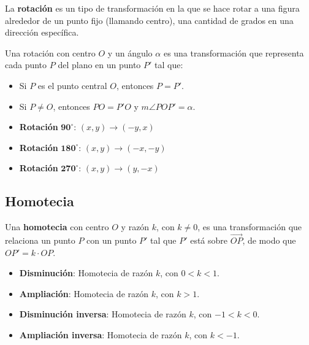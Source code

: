 La \textbf{rotación} es un tipo de transformación en la que se hace rotar a una figura alrededor de un punto fijo (llamando centro), una cantidad de grados en una dirección específica.

Una rotación con centro $O$ y un ángulo $\alpha$ es una transformación que representa cada punto $P$ del plano en un punto $P'$ tal que:

\begin{itemize}
    \item Si $P$ es el punto central $O$, entonces $P = P'$.
    \item Si $P \neq O$, entonces $PO = P'O$ y $m\angle{POP'} = \alpha$.
\end{itemize}

\begin{itemize}
    \item \textbf{Rotación} $\mathbf{90^{\circ}}$: $(x,y) \to (-y,x)$
    \item \textbf{Rotación} $\mathbf{180^{\circ}}$: $(x,y) \to (-x,-y)$
    \item \textbf{Rotación} $\mathbf{270^{\circ}}$: $(x,y) \to (y,-x)$
\end{itemize}


\subsection{Homotecia}

Una \textbf{homotecia} con centro $O$ y razón $k$, con $k \neq 0$, es una transformación que relaciona un punto $P$ con un punto $P'$ tal que $P'$ está sobre $\overrightarrow{OP}$, de modo que $OP' = k \cdot OP$.

\begin{itemize}
    \item \textbf{Disminución}: Homotecia de razón $k$, con $0 < k < 1$.
    \item \textbf{Ampliación}: Homotecia de razón $k$, con $k > 1$.
    \item \textbf{Disminución inversa}: Homotecia de razón $k$, con $-1 < k < 0$.
    \item \textbf{Ampliación inversa}: Homotecia de razón $k$, con $k < -1$.
\end{itemize}

\nocite{MGECED03}
\printbibliography[heading=subbibliography,title={Bibliografía}]